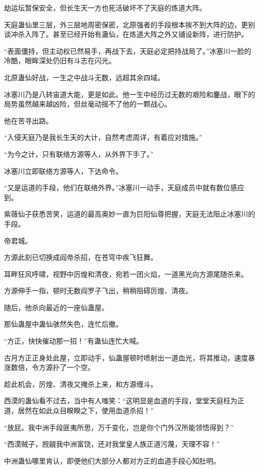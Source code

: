 \begin{this_body}
劫运坛暂保安全，但长生天一方也死活破坏不了天庭的炼道大阵。

天庭蛊仙里三层，外三层地周密保密，北原强者的手段根本挨不到大阵的边，更别谈冲杀入阵了。甚至已经开始有蛊仙，在炼道大阵之外又铺设新阵，进行防护。

“表面僵持，但主动权已然易手，再战下去，天庭必定把持战局了。”冰塞川一脸的冷酷，眼眸深处仍旧有斗志在闪光。

北原蛊仙好战，一生之中战斗无数，远超其余四域。

冰塞川乃是八转宙道大能，更是如此。他一生中经历过无数的艰险和鏖战，眼下的局势虽然越来越凶险，但丝毫动摇不了他的一颗战心。

他在苦寻出路。

“入侵天庭乃是我长生天的大计，自然考虑周详，有着应对措施。”

“为今之计，只有联络方源等人，从外界下手了。”

冰塞川立即联络方源等人，下达命令。

“又是运道的手段，他们在联络外界。”冰塞川一动手，天庭成员中就有数位感应到。

紫薇仙子获悉苦笑，运道的最高奥妙一直为巨阳仙尊把握，天庭无法阻止冰塞川的手段。

帝君城。

方源此刻已切换成阎帝杀招，在苍穹中疾飞狂舞。

耳畔狂风呼啸，视野中厉煌和清夜，宛若一团火焰，一道黑光向方源尾随杀来。

方源伸手一指，顿时无数阎罗子飞出，稍稍阻碍厉煌、清夜。

随后，他杀向最近的一座仙蛊屋。

那仙蛊屋中蛊仙骇然失色，连忙后撤。

“方正，快快催动那一招！”有蛊仙连忙大喊。

古月方正正身处此屋，立即动手，仙蛊屋顿时喷射出一道血光，将其推动，速度暴涨数倍，令方源扑了一个空。

趁此机会，厉煌、清夜又掩杀上来，和方源缠斗。

西漠的蛊仙看不过去，当中有人嗤笑：“这明显是血道的手段，堂堂天庭枉为正道，居然在如此众目睽睽之下，使用血道杀招！”

“放屁。我中洲手段匪夷所思，万千变化，岂是你个门外汉所能领悟得到？”

“西漠贼子，觊觎我中洲富饶，还对我堂皇人族正道污蔑，天理不容！”

中洲蛊仙哪里肯认，即便他们大部分人都对方正的血道手段心知肚明。


\end{this_body}
